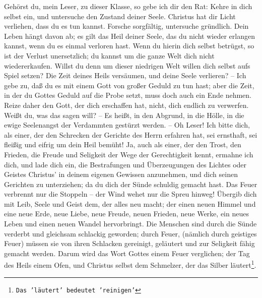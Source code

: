 Gehörst du, mein Leser, zu dieser Klasse, so gebe ich dir den Rat: Kehre in dich
selbst ein, und untersuche den Zustand deiner Seele. Christus hat dir Licht
verliehen, dass du es tun kannst. Forsche sorgfältig, untersuche gründlich. Dein
Leben hängt davon ab; es gilt das Heil deiner Seele, das du nicht wieder
erlangen kannst, wenn du es einmal verloren hast. Wenn du hierin dich selbst
betrügst, so ist der Verlust unersetzlich; du kannst um die ganze Welt dich
nicht wiedererkaufen. Willst du denn um dieser niedrigen Welt willen dich selbst
aufs Spiel setzen? Die Zeit deines Heils versäumen, und deine Seele verlieren?
-- Ich gebe zu, daß du es mit einem Gott von großer Geduld zu tun hast; aber
die Zeit, in der du Gottes Geduld auf die Probe setzt, muss doch auch ein Ende
nehmen. Reize daher den Gott, der dich erschaffen hat, nicht, dich endlich zu
verwerfen. Weißt du, was das sagen will? -- Es heißt, in den Abgrund, in die
Hölle, in die ewige Seelenangst der Verdammten gestürzt werden. -- Oh Leser! Ich
bitte dich, als einer, der den Schrecken der Gerichte des Herrn erfahren hat,
sei ernsthaft, sei fleißig und eifrig um dein Heil bemüht! Ja, auch als einer,
der den Trost, den Frieden, die Freude und Seligkeit der Wege der Gerechtigkeit
kennt, ermahne ich dich, und lade dich ein, die Bestrafungen und Überzeugungen
des Lichtes oder Geistes Christus' in deinem eigenen Gewissen anzunehmen, und
dich seinen Gerichten zu unterziehen; da du dich der Sünde schuldig gemacht
hast. Das Feuer verbrennt nur die Stoppeln -- der Wind wehet nur die Spreu
hinweg! Übergib dich mit Leib, Seele und Geist dem, der alles neu macht; der
einen neuen Himmel und eine neue Erde, neue Liebe, neue Freude, neuen Frieden,
neue Werke, ein neues Leben und einen neuen Wandel hervorbringt. Die Menschen
sind durch die Sünde verderbt und gleichsam schlackig geworden; durch Feuer,
(nämlich durch geistiges Feuer) müssen sie von ihren Schlacken gereinigt,
geläutert und zur Seligkeit fähig gemacht werden. Darum wird das Wort Gottes
einem Feuer verglichen; der Tag des Heils einem Ofen, und Christus selbst dem
Schmelzer, der das Silber läutert\footnote{\texttt{Das 'läutert' bedeutet
'reinigen'}}.

\medskip

